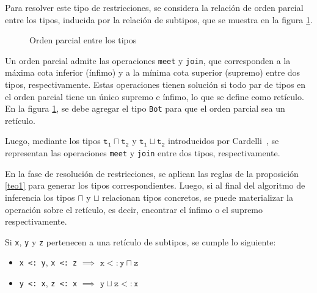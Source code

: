 Para resolver este tipo de restricciones, se considera la relación de orden parcial entre los tipos, inducida por la relación de subtipos, que se muestra en la figura \ref{subt1}.

\begin{figure}[ht]
  \centering
  \caption{Orden parcial entre los tipos}
  \label{subt1}
\end{figure}

Un orden parcial admite las operaciones \texttt{meet} y \texttt{join}, que corresponden a la máxima cota inferior (ínfimo) y a la mínima cota superior (supremo) entre dos tipos, respectivamente. Estas operaciones tienen solución si todo par de tipos en el orden parcial tiene un único supremo e ínfimo, lo que se define como retículo. En la figura \ref{subt1}, se debe agregar el tipo \texttt{Bot} para que el orden parcial sea un retículo.

Luego, mediante los tipos $\mathtt{t_1 \sqcap t_2}$ y $\mathtt{t_1 \sqcup t_2}$ introducidos por Cardelli~\cite{cardelli}, se representan las operaciones \texttt{meet} y \texttt{join} entre dos tipos, respectivamente.

En la fase de resolución de restricciones, se aplican las reglas de la proposición \ref{teo1} para generar los tipos correspondientes. Luego, si al final del algoritmo de inferencia los tipos $\sqcap$ y $\sqcup$ relacionan tipos concretos, se puede materializar la operación sobre el retículo, es decir, encontrar el ínfimo o el supremo respectivamente.


\begin{prop} \label{teo1} \normalfont Si \texttt{x}, \texttt{y} y \texttt{z} pertenecen a una retículo de subtipos, se cumple lo siguiente:
  \begin{itemize}
    \item \texttt{x <: y}, \texttt{x <: z} $\implies$ $\mathtt{x <: y \sqcap z}$
    \item \texttt{y <: x}, \texttt{z <: x} $\implies$ $\mathtt{y \sqcup z <: x}$
  \end{itemize}
\end{prop}

